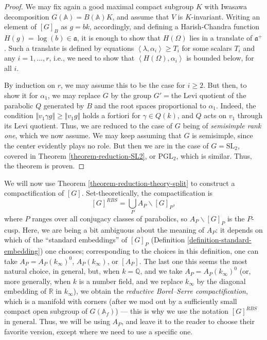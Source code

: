 \begin{proof}
 We may fix again a good maximal compact subgroup $K$ with Iwasawa decomposition $G(\mathbb A) = B(\mathbb A)K$, and assume that $V$ is $K$-invariant. Writing an element of $[G]_B$ as $g=bk$, accordingly, and defining a Harish-Chandra function $H(g) = \log(b)\in \mathfrak a$, it is enough to show that $H(\Omega)$ lies in a translate of $\mathfrak a^+$. Such a translate is defined by equations $\left < \lambda, \alpha_i\right> \ge T_i$ for some scalars $T_i$ and any $i=1,\dots ,r$, i.e., we need to show that $\left< H(\Omega), \alpha_i\right>$ is bounded below, for all $i$. 
 
 By induction on $r$, we may assume this to be the case for $i \ge 2$. But then, to show it for $\alpha_1$, we may replace $G$ by the group $G'=$the Levi quotient of the parabolic $Q$ generated by $B$ and the root spaces proportional to $\alpha_1$. Indeed, the condition $\Vert v_1 \gamma g \Vert \ge \Vert v_1 g\Vert$ holds a fortiori for $\gamma \in Q (k)$, and $Q$ acts on $v_1$ through its Levi quotient. Thus, we are reduced to the case of $G$ being of \emph{semisimple rank one}, which we now assume. We may keep assuming that $G$ is semisimple, since the center evidently plays no role. But then we are in the case of $G = \text{SL}_2$, covered in Theorem \ref{theorem-reduction-SL2}, or $\text{PGL}_2$, which is similar. Thus, the theorem is proven. 
\end{proof}

We will now use Theorem \ref{theorem-reduction-theory-split} to construct a compactification of $[G]$. Set-theoretically, the compactification is
$$ {[G]}^{RBS} = \bigcup_P A_P\backslash [G]_P,$$
where $P$ ranges over all conjugacy classes of parabolics, so $A_P\backslash [G]_P$ is the $P$-cusp. Here, we are being a bit ambiguous about the meaning of $A_P$: it depends on which of the ``standard embeddings''  of $[G]_P$ (Definition \ref{definition-standard-embedding}) one chooses; corresponding to the choices in this definition, one can take $A_P = A_P(k_\infty)^0$, $A_P(k_\infty)$, or $[A_P]$. The last one this seems the most natural choice, in general, but, when $k = \mathbb Q$, and we take $A_P = A_P(k_\infty)^0$ (or, more generally, when $k$ is a number field, and we replace $k_\infty$ by the diagonal embedding of $\mathbb R$ in $k_\infty$), we obtain the \emph{reductive Borel--Serre compactification}, which is a manifold with corners (after we mod out by a sufficiently small compact open subgroup of $G(\mathbb A_f)$) --- this is why we use the notation ${[G]}^{RBS}$ in general. Thus, we will be using $A_P$, and leave it to the reader to choose their favorite version, except where we need to use a specific one.


